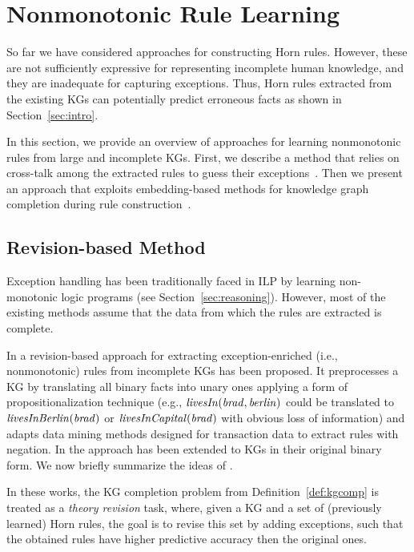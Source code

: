 \section{Nonmonotonic Rule Learning}\label{sec:nmrulelearn}
So far we have considered approaches for constructing Horn rules. However,  these are not sufficiently expressive for representing incomplete human knowledge, and they are inadequate for capturing
exceptions. Thus, Horn rules extracted from the existing KGs can potentially %
predict erroneous facts as shown in Section~\ref{sec:intro}. 

In this section, we provide an overview of approaches for learning nonmonotonic rules from large and incomplete KGs. First, we describe a method that relies on cross-talk among the extracted rules to guess their exceptions~\cite{gad2016,rumis}. Then we present an approach that exploits embedding-based methods for knowledge graph completion during rule construction~\cite{thinh2018}.

\subsection{Revision-based Method}
Exception handling has been traditionally faced in ILP by learning non-monotonic logic programs \cite{DBLP:conf/ijcai/InoueK97,DBLP:journals/tocl/Sakama05,XHAIL,CorapiRL10,ILASP_system} (see Section~\ref{sec:reasoning}). However, most of the existing methods assume that the data from which the rules are extracted is complete.

In \cite{gad2016} a revision-based approach for extracting exception-enriched (i.e., nonmonotonic) rules from incomplete KGs has been proposed. 
It preprocesses a KG by translating all binary facts into unary ones applying a form of propositionalization technique \cite{propos} (e.g., $\mathit{livesIn(brad,berlin)}$ could be translated to $\mathit{livesInBerlin(brad)}$ or $\mathit{livesInCapital(brad)}$ with obvious loss of information) and adapts data mining methods designed for transaction data to extract rules with negation. In \cite{rumis} the approach has been extended to KGs in their original binary form. We now briefly summarize the ideas of  \cite{gad2016,rumis}.

In these works, the KG completion problem from Definition~\ref{def:kgcomp} is treated 
as a \emph{theory revision} task, where, given a KG and a set of (previously learned) Horn rules, the goal is to revise this set by adding exceptions, such that the obtained rules have higher predictive accuracy then the original ones. 

